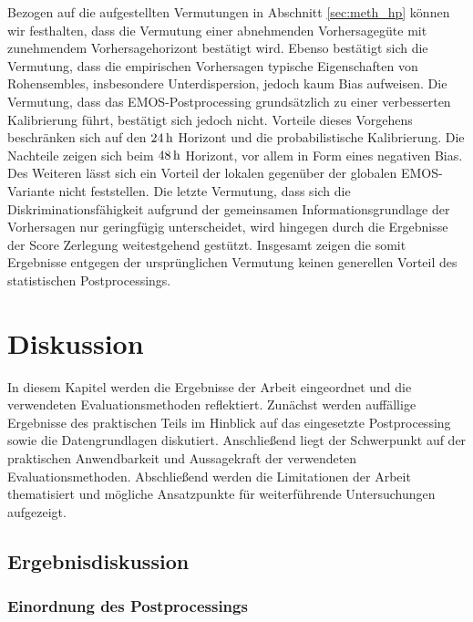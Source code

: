 Bezogen auf die aufgestellten Vermutungen in Abschnitt \ref{sec:meth_hp} können wir festhalten, dass die Vermutung einer abnehmenden Vorhersagegüte mit zunehmendem Vorhersagehorizont bestätigt wird. Ebenso bestätigt sich die Vermutung, dass die empirischen Vorhersagen typische Eigenschaften von Rohensembles, insbesondere Unterdispersion, jedoch kaum Bias aufweisen. Die Vermutung, dass das EMOS-Postprocessing grundsätzlich zu einer verbesserten Kalibrierung führt, bestätigt sich jedoch nicht. Vorteile dieses Vorgehens beschränken sich auf den $24\,\mathrm{h}$ Horizont und die probabilistische Kalibrierung. Die Nachteile zeigen sich beim $48\,\mathrm{h}$ Horizont, vor allem in Form eines negativen Bias. Des Weiteren lässt sich ein Vorteil der lokalen gegenüber der globalen EMOS-Variante nicht feststellen. Die letzte Vermutung, dass sich die Diskriminationsfähigkeit aufgrund der gemeinsamen Informationsgrundlage der Vorhersagen nur geringfügig unterscheidet, wird hingegen durch die Ergebnisse der Score Zerlegung weitestgehend gestützt. Insgesamt zeigen die somit Ergebnisse entgegen der ursprünglichen Vermutung keinen generellen Vorteil des statistischen Postprocessings.


\chapter{Diskussion} \label{chap:discuss}
In diesem Kapitel werden die Ergebnisse der Arbeit eingeordnet und die verwendeten Evaluationsmethoden reflektiert. Zunächst werden auffällige Ergebnisse des praktischen Teils im Hinblick auf das eingesetzte Postprocessing sowie die Datengrundlagen diskutiert. Anschließend liegt der Schwerpunkt auf der praktischen Anwendbarkeit und Aussagekraft der verwendeten Evaluationsmethoden. Abschließend werden die Limitationen der Arbeit thematisiert und mögliche Ansatzpunkte für weiterführende Untersuchungen aufgezeigt.

\section{Ergebnisdiskussion} \label{sec:disc_res}

\subsection{Einordnung des Postprocessings}

